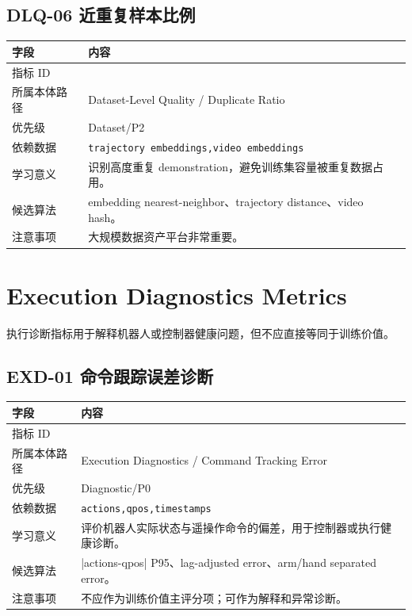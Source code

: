 \documentclass[UTF8,zihao=-4,oneside,openany]{ctexrep}
\newcommand{\Code}[1]{\texttt{#1}}
\newcommand{\MID}[1]{\texttt{\seqsplit{#1}}}
\begin{document}
\subsection{DLQ-06 近重复样本比例}

\begin{longtable}{L{3.6cm} L{9.6cm}}
\toprule
字段 & 内容 \\
\midrule
指标 ID & \MID{DLQ-06} \\
所属本体路径 & Dataset-Level Quality / Duplicate Ratio \\
优先级 & Dataset/P2 \\
依赖数据 & \Code{trajectory embeddings,video embeddings} \\
学习意义 & 识别高度重复 demonstration，避免训练集容量被重复数据占用。 \\
候选算法 & embedding nearest-neighbor、trajectory distance、video hash。 \\
注意事项 & 大规模数据资产平台非常重要。 \\
\bottomrule
\end{longtable}

\section{Execution Diagnostics Metrics}

执行诊断指标用于解释机器人或控制器健康问题，但不应直接等同于训练价值。


\subsection{EXD-01 命令跟踪误差诊断}

\begin{longtable}{L{3.6cm} L{9.6cm}}
\toprule
字段 & 内容 \\
\midrule
指标 ID & \MID{EXD-01} \\
所属本体路径 & Execution Diagnostics / Command Tracking Error \\
优先级 & Diagnostic/P0 \\
依赖数据 & \Code{actions,qpos,timestamps} \\
学习意义 & 评价机器人实际状态与遥操作命令的偏差，用于控制器或执行健康诊断。 \\
候选算法 & |actions-qpos| P95、lag-adjusted error、arm/hand separated error。 \\
注意事项 & 不应作为训练价值主评分项；可作为解释和异常诊断。 \\
\bottomrule
\end{longtable}
\end{document}
